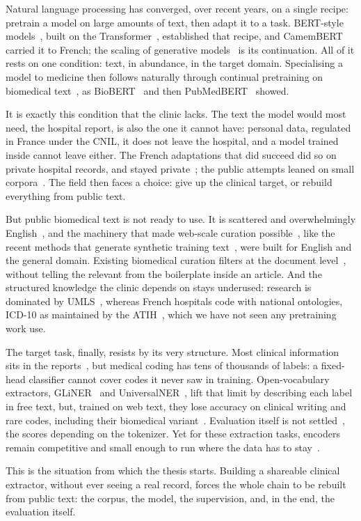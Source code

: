 
\noindent Natural language processing has converged, over recent years, on a single recipe:
pretrain a model on large amounts of text, then adapt it to a task. BERT-style
models~\citep{devlin_bert_2019}, built on the Transformer~\citep{vaswani2017attention},
established that recipe, and CamemBERT~\citep{martin-etal-2020-camembert} carried it to
French; the scaling of generative models~\citep{gpt3,touvron2023llama} is its
continuation. All of it rests on one condition: text, in abundance, in the target
domain. Specialising a model to medicine then follows naturally through continual
pretraining on biomedical text~\citep{gururangan_dont_2020}, as
BioBERT~\citep{lee_biobert_2019} and then PubMedBERT~\citep{gu_domain-specific_2022}
showed.

It is exactly this condition that the clinic lacks. The text the model would most need,
the hospital report, is also the one it cannot have: personal data, regulated in France
under the CNIL, it does not leave the hospital, and a model trained inside cannot leave
either. The French adaptations that did succeed did so on private hospital records, and
stayed private~\citep{dura_learning_2022}; the public attempts leaned on small
corpora~\citep{copara_contextualized_2020,le_clercq_de_lannoy_strategies_2022}. The
field then faces a choice: give up the clinical target, or rebuild everything from
public text.

But public biomedical text is not ready to use. It is scattered and overwhelmingly
English~\citep{labrak-etal-2024-biomistral}, and the machinery that made web-scale
curation possible~\citep{penedo2024fineweb}, like the recent methods that generate synthetic
training text~\citep{yang2025entigraph}, were built for English and the
general domain. Existing biomedical curation filters at the document
level~\citep{chen2023meditron}, without telling the relevant from the boilerplate
inside an article. And the structured knowledge the clinic depends on stays underused:
research is dominated by UMLS~\citep{lindberg_unified_1993}, whereas French hospitals
code with national ontologies, ICD-10 as maintained by the ATIH~\citep{atih_pmsi}, which
we have not seen any pretraining work use.

The target task, finally, resists by its very structure. Most clinical information sits
in the reports~\citep{raghavan_how_2014}, but medical coding has tens of thousands of
labels: a fixed-head classifier cannot cover codes it never saw in training.
Open-vocabulary extractors, GLiNER~\citep{zaratiana2024gliner} and
UniversalNER~\citep{zhou2024universalner}, lift that limit by describing each label in
free text, but, trained on web text, they lose accuracy on clinical writing and rare
codes, including their biomedical variant~\citep{zaratiana2025glinerbiomed}. Evaluation
itself is not settled~\citep{drbenchmark2024}, the scores depending on the tokenizer.
Yet for these extraction tasks, encoders remain competitive and small enough to run
where the data has to stay~\citep{lehman_we_2023}.

This is the situation from which the thesis starts. Building a shareable clinical
extractor, without ever seeing a real record, forces the whole chain to be rebuilt from
public text: the corpus, the model, the supervision, and, in the end, the evaluation
itself.
